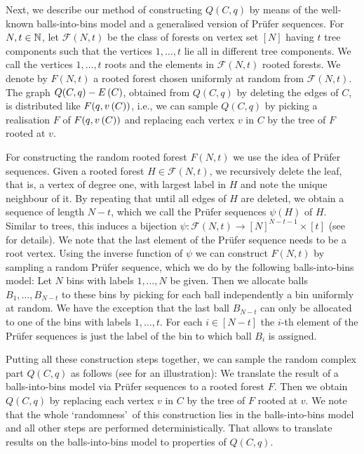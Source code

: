 Next, we describe our method of constructing $Q(C,q)$ by means of the well-known balls-into-bins model and a generalised version of Prüfer sequences. For $N,t\in \mathbb{N}$, let $\mathcal{F}(N,t)$ be the class of forests on vertex set $[N]$ having $t$ tree components such that the vertices $1, \ldots, t$ lie all in different tree components. We call the vertices $1, \ldots, t$ roots and the elements in $\mathcal{F}(N,t)$ rooted forests. We denote by $F(N,t)$ a rooted forest chosen uniformly at random from $\mathcal{F}(N,t)$. The graph $Q(C,q)-E\left(C\right)$, obtained from $Q(C,q)$ by deleting the edges of $C$, is distributed like $F(q, v\left({C}\right))$, i.e., we can sample $Q(C,q)$ by picking a realisation $F$ of $F(q, v\left({C}\right))$ and replacing each vertex $v$ in $C$ by the tree of $F$ rooted at $v$.

For constructing the random rooted forest $F(N,t)$ we use the idea of Prüfer sequences. Given a rooted forest $H\in\mathcal{F}(N,t)$, we recursively delete the leaf, that is, a vertex of degree one, with largest label in $H$ and note the unique neighbour of it. By repeating that until all edges of $H$ are deleted, we obtain a sequence of length $N-t$, which we call the Prüfer sequences $\psi(H)$ of $H$. Similar to trees, this induces a bijection $\psi:\mathcal{F}(N,t)\to [N]^{N-t-1}\times [t]$ (see  for details). We note that the last element of the Prüfer sequence needs to be a root vertex. Using the inverse function of $\psi$ we can construct $F(N,t)$ by sampling a random Prüfer sequence, which we do by the following balls-into-bins model: Let $N$ bins with labels $1, \ldots, N$ be given. Then we allocate balls $B_1, \ldots, B_{N-t}$ to these bins by picking for each ball independently a bin uniformly at random. We have the exception that the last ball $B_{N-t}$ can only be allocated to one of the bins with labels $1, \ldots, t$. For each $i\in[N-t]$ the $i$-th element of the Prüfer sequences is just the label of the bin to which ball $B_i$ is assigned.

Putting all these construction steps together, we can sample the random complex part $Q(C,q)$ as follows (see  for an illustration): We translate the result of a balls-into-bins model via Prüfer sequences to a rooted forest $F$. Then we obtain $Q(C,q)$ by replacing each vertex $v$ in $C$ by the tree of $F$ rooted at $v$. We note that the whole \lq randomness\rq\ of this construction lies in the balls-into-bins model and all other steps are performed deterministically. That allows to translate results on the balls-into-bins model to properties of $Q(C,q)$. 

